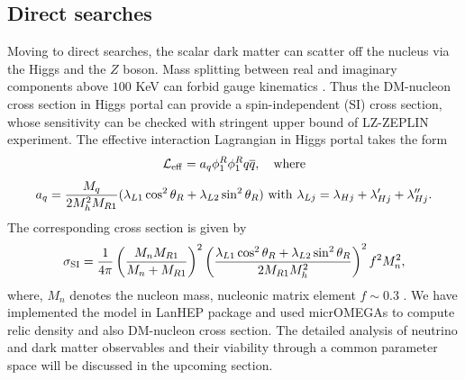 \documentclass[aps, a4paper,superscriptaddress,12pt,preprintnumbers,floatfix,nofootinbib,amsmath,amssymb]{revtex4}
\begin{document}
\subsection{Direct searches}
Moving to direct searches, the scalar dark matter can scatter off the nucleus via the Higgs and the $Z$ boson. Mass splitting between real and imaginary components above $100$ KeV can forbid gauge kinematics \cite{Dolle:2009fn}. Thus the DM-nucleon cross section in Higgs portal can provide a spin-independent (SI) cross section, whose sensitivity can be checked with stringent upper bound of LZ-ZEPLIN experiment. The effective interaction Lagrangian in Higgs portal takes the form
\begin{equation}
    \mathcal{L}_{\rm eff} = a_q \phi^R_1 \phi^R_1 q \overline{q}, \quad {\rm where}
\end{equation}
\begin{equation}
    a_q = \frac{M_q}{2 M^2_h M_{R1}} (\lambda_{L1} \cos^2\theta_R + \lambda_{L2}\sin^2\theta_R) ~{\rm with}~ \lambda_{Lj} = \lambda_{Hj}+\lambda^\prime_{Hj}+\lambda^{\prime\prime}_{Hj}.\nonumber
\end{equation}
The corresponding cross section is given by \cite{LopezHonorez:2006gr,Barbieri:2006dq,Dolle:2009fn}
\begin{equation}
    \sigma_{\rm SI} = \frac{1}{4\pi}\left(\frac{M_n M_{R1}}{M_n + M_{R1}}\right)^2 \left(\frac{\lambda_{L1} \cos^2\theta_R + \lambda_{L2}\sin^2\theta_R}{2 M_{R1} M_h^2}\right)^2 f^2 M_n^2,
\end{equation}
where, $M_n$ denotes the nucleon mass, nucleonic matrix element $f \sim 0.3$ \cite{Ellis:2000ds}. We have implemented the model in LanHEP \cite{Semenov:1996es} package and used micrOMEGAs \cite{Pukhov:1999gg, Belanger:2006is, Belanger:2008sj} to compute relic density and also DM-nucleon cross section. The detailed analysis of neutrino and dark matter observables  and their viability through a common parameter space will be discussed in the upcoming section.
%
\end{document}
